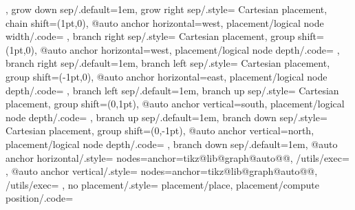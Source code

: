 {{{  },
  grow down sep/.default=1em,
  grow right sep/.style={
    Cartesian placement,
    chain shift={(1pt,0)},
    @auto anchor horizontal=west,
    placement/logical node width/.code=
  },
  branch right sep/.style={
    Cartesian placement,
    group shift={(1pt,0)},
    @auto anchor horizontal=west,
    placement/logical node depth/.code=
  },
  branch right sep/.default=1em,
  branch left sep/.style={
    Cartesian placement,
    group shift={(-1pt,0)},
    @auto anchor horizontal=east,
    placement/logical node depth/.code=
  },
  branch left sep/.default=1em,
  branch up sep/.style={
    Cartesian placement,
    group shift={(0,1pt)},
    @auto anchor vertical=south,
    placement/logical node depth/.code=
  },
  branch up sep/.default=1em,
  branch down sep/.style={
    Cartesian placement,
    group shift={(0,-1pt)},
    @auto anchor vertical=north,
    placement/logical node depth/.code=
  },
  branch down sep/.default=1em,
  @auto anchor horizontal/.style={
    nodes={anchor=\csname tikz@lib@graph@auto@\tikz@lib@graph@auto@h @\tikz@lib@graph@auto@v\endcsname},
    /utils/exec=\def\tikz@lib@graph@auto@h{#1}
  },
  @auto anchor vertical/.style={
    nodes={anchor=\csname tikz@lib@graph@auto@\tikz@lib@graph@auto@h @\tikz@lib@graph@auto@v\endcsname},
    /utils/exec=\def\tikz@lib@graph@auto@v{#1}
  },
  no placement/.style={
    placement/place,
    placement/compute position/.code=%
  }
}

\def\tikz@lib@graph@auto@h{center}
\def\tikz@lib@graph@auto@v{center}

\def\tikz@lib@graph@auto@center@center{center}
\def\tikz@lib@graph@auto@west@center{west}
\def\tikz@lib@graph@auto@east@center{east}
\def\tikz@lib@graph@auto@center@north{north}
\def\tikz@lib@graph@auto@west@north{north west}
\def\tikz@lib@graph@auto@east@north{north east}
\def\tikz@lib@graph@auto@center@south{south}
\def\tikz@lib@graph@auto@west@south{south west}
\def\tikz@lib@graph@auto@east@south{south east}

\def\tikz@lib@graph@linear@pos{%
  \pgfkeysgetvalue{/tikz/graphs/chain shift}\tikz@temp
  \expandafter\tikz@scan@one@point\expandafter\pgf@process\tikz@temp
  \pgf@process{\pgfpointscale{\pgfkeysvalueof{/tikz/graphs/placement/width}}{}}%
  \pgf@xa=\pgf@x%
  \pgf@ya=\pgf@y%
  \pgfkeysgetvalue{/tikz/graphs/group shift}\tikz@temp
  \expandafter\tikz@scan@one@point\expandafter\pgf@process\tikz@temp
  \pgf@process{\pgfpointscale{\pgfkeysvalueof{/tikz/graphs/placement/depth}}{}}%
  \advance\pgf@xa by\pgf@x%
  \advance\pgf@ya by\pgf@y%
  \edef\tikz@lib@graph@shift{(\the\pgf@xa,\the\pgf@ya)}
  \pgfkeys{/tikz/graphs/nodes/.expanded={shift={\tikz@lib@graph@shift}}}
}


}
